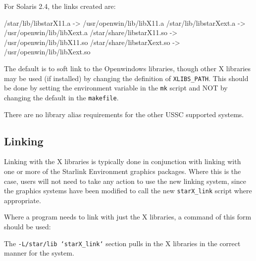 \documentclass[11pt,nolof,noabs]{starlink}
\begin{document}
For Solaris 2.4, the links created are:

\begin{terminalv}
/star/lib/libstarX11.a -> /usr/openwin/lib/libX11.a
/star/lib/libstarXext.a -> /usr/openwin/lib/libXext.a
/star/share/libstarX11.so -> /usr/openwin/lib/libX11.so
/star/share/libstarXext.so -> /usr/openwin/lib/libXext.so
\end{terminalv}

The default is to soft link to the Openwindows libraries, though other X
libraries may be used (if installed) by changing the definition of
\texttt{XLIBS\_PATH}.  This should be done by setting the environment variable
in the \texttt{mk} script and NOT by changing the default in the \texttt{makefile}.

There are no library alias requirements for the other USSC supported systems.

\subsection{Linking}

Linking with the X libraries is typically done in conjunction with linking
with one or more of the Starlink Environment graphics packages.  Where this
is the case, users will not need to take any action to use the new
linking system, since the graphics systems have been modified to call
the new \texttt{starX\_link} script where appropriate.

Where a program needs to link with just the X libraries, a command of
this form should be used:

\begin{terminalv}
\end{terminalv}

The \texttt{-L/star/lib `starX\_link`} section pulls in the X libraries in
the correct manner for the system.
\end{document}
